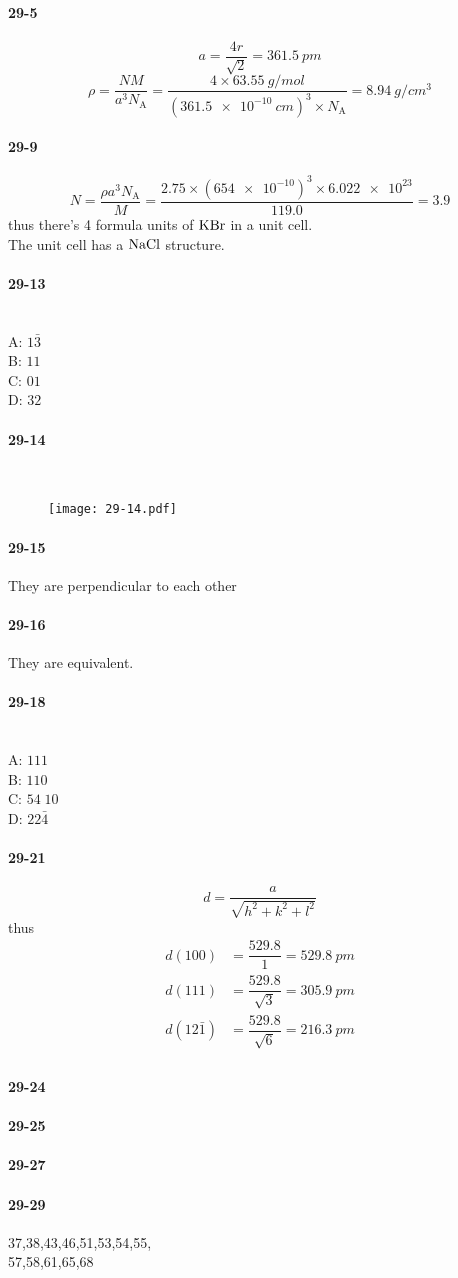 \documentclass[a4paper]{article}
\newcommand{\NA}{N_\mathrm{A}}
\newcommand{\ex}[1]{\paragraph{29-#1}}
\numberwithin{equation}{section}
\begin{document}
\ex{5}
\begin{equation}\label{key}
a = \dfrac{4r}{\sqrt{2}} = \SI{361.5}{pm}
\end{equation}
\begin{equation}\label{key}
\rho = \dfrac{NM}{a^3\NA} = \dfrac{4\times \SI{63.55}{g/mol}}{(\SI{361.5e-10}{cm})^3\times \NA} = \SI{8.94}{g/cm^3}
\end{equation}

\ex{9}
\begin{equation}\label{key}
N = \dfrac{\rho a^3 \NA}{M} = \dfrac{2.75 \times (\num{654e-10})^3 \times \num{6.022e23}}{119.0} = 3.9
\end{equation}
thus there's 4 formula units of $ \ce{KBr} $ in a unit cell.\\
The unit cell has a $ \ce{NaCl} $ structure.


\ex{13}~\\
A: $ 1\bar{3} $\\
B: $ 11 $\\
C: $ 01 $\\
D: $ 32 $\\

\ex{14}~\\
\begin{figure}[H]
	\centering
	\texttt{[image: 29-14.pdf]}
\end{figure}

\ex{15}
They are perpendicular to each other

\ex{16}
They are equivalent.

\ex{18}~\\
A: $ 111 $\\
B: $ 110 $\\
C: $ 54\; 10 $\\
D: $ 22\bar{4} $\\

\ex{21}
\begin{equation}\label{key}
d = \dfrac{a}{\sqrt{h^2 + k^2 + l^2}}
\end{equation}
thus
\begin{align}
d(100) &= \dfrac{529.8}{1} = \SI{529.8}{pm}\\
d(111) &= \dfrac{529.8}{\sqrt{3}} = \SI{305.9}{pm}\\
d(12\bar{1}) &= \dfrac{529.8}{\sqrt{6}} = \SI{216.3}{pm}\\
\end{align}

\ex{24}


\ex{25}



\ex{27}


\ex{29}


37,38,43,46,51,53,54,55,\\
57,58,61,65,68\\
\end{document}
